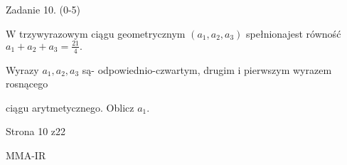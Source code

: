 \documentclass[a4paper,12pt]{article}
\begin{document}
Zadanie 10. (0-5)

$\mathrm{W}$ trzywyrazowym ciągu geometrycznym $(a_{1},a_{2},a_{3})$ spełnionajest równość $a_{1}+a_{2}+a_{3}=\displaystyle \frac{21}{4}.$

Wyrazy $a_{1}, a_{2}, a_{3}$ są- odpowiednio-czwartym, drugim i pierwszym wyrazem rosnącego

ciągu arytmetycznego. Oblicz $a_{1}.$

Strona 10 z22

MMA-IR
\end{document}
